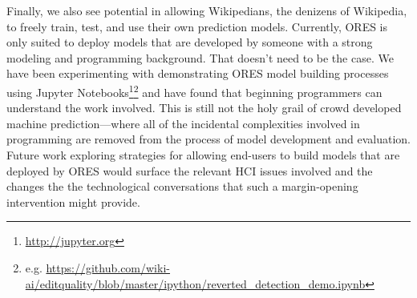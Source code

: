 Finally, we also see potential in allowing Wikipedians, the denizens of Wikipedia, to freely train, test, and use their own prediction models.  Currently, ORES is only suited to deploy models that are developed by someone with a strong modeling and programming background.  That doesn't need to be the case.  We have been experimenting with demonstrating ORES model building processes using Jupyter Notebooks\footnote{\url{http://jupyter.org}}\footnote{e.g. \url{ https://github.com/wiki-ai/editquality/blob/master/ipython/reverted\_detection\_demo.ipynb}} and have found that beginning programmers can understand the work involved.  This is still not the holy grail of crowd developed machine prediction---where all of the incidental complexities involved in programming are removed from the process of model development and evaluation.  Future work exploring strategies for allowing end-users to build models that are deployed by ORES would surface the relevant HCI issues involved and the changes the the technological conversations that such a margin-opening intervention might provide.
